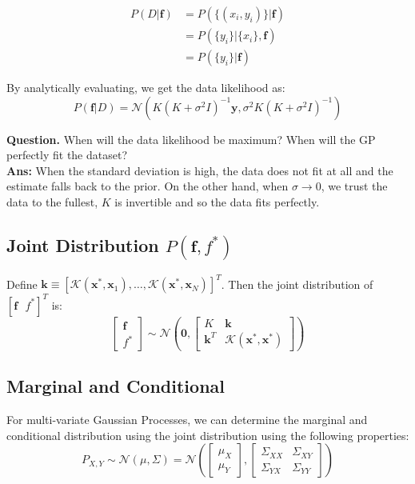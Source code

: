 \documentclass[12pt]{article}
\begin{document}
\vspace{-1em}

\begin{align*}
    P(D|\mathbf{f}) &= P(\{(x_i,y_i)\} | \mathbf{f}) \\
    &= P(\{y_i\} | \{x_i\}, \mathbf{f}) \\
    &= P(\{y_i\} | \mathbf{f})
\end{align*}

\noindent By analytically evaluating, we get the data likelihood as: \[ P(\mathbf{f}|D) = \mathcal{N}(K(K + \sigma^2 I)^{-1} \mathbf{y}, \sigma^2 K(K + \sigma^2 I)^{-1}) \]

\noindent \textbf{Question.} When will the data likelihood be maximum? When will the GP perfectly fit the dataset? \\
\noindent \textbf{Ans:\hspace{3mm}} When the standard deviation is high, the data does not fit at all and the estimate falls back to the prior. On the other hand, when $\sigma \rightarrow 0$, we trust the data to the fullest, $K$ is invertible and so the data fits perfectly.

\subsection{Joint Distribution $P(\mathbf{f},f^*)$}

Define $\mathbf{k} \equiv [\mathcal{K}(\mathbf{x}^*,\mathbf{x}_1),\dots,\mathcal{K}(\mathbf{x}^*,\mathbf{x}_N)]^T$. Then the joint distribution of $[\mathbf{f} \text{ } f^*]^T$ is: \[ \begin{bmatrix}
    \mathbf{f} \\
    f^*
\end{bmatrix} \sim \mathcal{N} \left( \mathbf{0}, \begin{bmatrix}
    K & \mathbf{k} \\
    \mathbf{k}^T & \mathcal{K}(\mathbf{x}^*,\mathbf{x}^*)
\end{bmatrix} \right) \]

\subsection{Marginal and Conditional}

For multi-variate Gaussian Processes, we can determine the marginal and conditional distribution using the joint distribution using the following properties: \[ P_{X,Y} \sim \mathcal{N}(\mu,\Sigma) = \mathcal{N} \left( \begin{bmatrix}
    \mu_X \\
    \mu_Y
\end{bmatrix}, \begin{bmatrix}
    \Sigma_{XX} & \Sigma_{XY} \\
    \Sigma_{YX} & \Sigma_{YY}
\end{bmatrix} \right) \]
\end{document}
